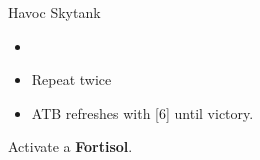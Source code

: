 \begin{paracol}{2}
\begin{battle}{Havoc Skytank}
\begin{itemize}
\begin{itemize}
\begin{itemize}
					            \item \stagger
					            \item Repeat twice
					            \item ATB refreshes with [6] until victory.
				            \end{itemize}
			      \end{itemize}
		\end{itemize}
	\end{battle}
	\switchcolumn
	\renewcommand{\first}{[1] Aggression (\com/\com/\rav)}
	\renewcommand{\second}{[2] Relentless Assault (\rav/\com/\rav)}
	\renewcommand{\third}{[3] Aggression (\com/\com/\rav)}
	\renewcommand{\fourth}{[4] Tireless Charge (\com/\com/\med)}
	\renewcommand{\fifth}{[5] Strike Team (\com/\com/\syn)}
	\renewcommand{\sixth}{[6] Tireless Charge (\com/\com/\med)}

	Activate a \textbf{Fortisol}.


\end{paracol}
